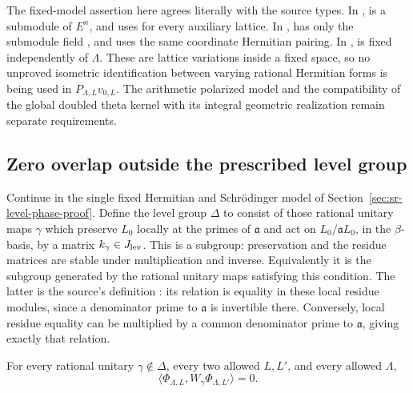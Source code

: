 The fixed-model assertion here agrees literally with the source
types.  In , 
is a submodule of \(E^n\), and  uses
 for every auxiliary lattice.
In ,  has only the submodule
field , and  uses the same
coordinate Hermitian pairing.  In ,
 is fixed independently of \(\Lambda\).
These are lattice variations inside a fixed space, so no
unproved isometric identification between varying rational
Hermitian forms is being used in \(P_{\Lambda,L}v_{0,L}\).
The arithmetic polarized model and the compatibility of the
global doubled theta kernel with its integral geometric
realization remain separate requirements.

\subsection{Zero overlap outside the prescribed level group}
\label{subsec:sr-level-support}

Continue in the single fixed Hermitian and Schr\"odinger model
of Section~\ref{sec:sr-level-phase-proof}.
Define the level group \(\Delta\) to consist of those rational
unitary maps \(\gamma\) which preserve \(L_0\) locally at the
primes of \(\mathfrak a\) and act on
\(L_0/\mathfrak aL_0\), in the \(\beta\)-basis, by a matrix
\(k_\gamma\in J_{\rm lev}\).
This is a subgroup: preservation and the residue matrices
are stable under multiplication and inverse.
Equivalently it is the subgroup generated by the rational
unitary maps satisfying this condition.
The latter is the source's definition :
its  relation is equality in these local residue
modules, since a denominator prime to \(\mathfrak a\) is
invertible there.  Conversely, local residue equality can be
multiplied by a common denominator prime to
\(\mathfrak a\), giving exactly that  relation.

\begin{srproposition}\label{prop:sr-level-outside-zero}
For every rational unitary \(\gamma\notin\Delta\), every two
allowed \(L,L'\), and every allowed \(\Lambda\),
\[
       \langle\Phi_{\Lambda,L},
                        W_\gamma\Phi_{\Lambda,L'}\rangle=0 .
\]
\end{srproposition}

